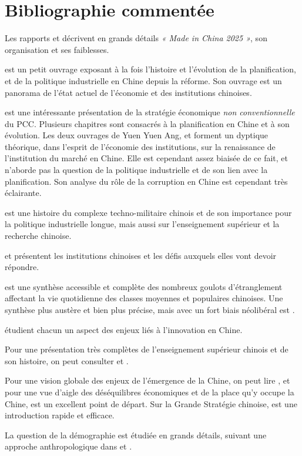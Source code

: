 \documentclass[a4paper]{article}
\begin{document}
\section{Bibliographie commentée}
\label{sec:orgc4508dc}

Les rapports \cite{Made_In_China_2025} et \cite{Evolving_MiC25} décrivent en grands détails \textit{« Made in China 2025 »}, son organisation et ses faiblesses.

\cite{naughton21_rise} est un petit ouvrage exposant à la fois l’histoire et l’évolution de la planification, et de la politique industrielle en Chine depuis la réforme. Son ouvrage \cite{naughton18_chines} est un panorama de l’état actuel de l’économie et des institutions chinoises.

\cite{heilmann18_red} est une intéressante présentation de la stratégie économique \textit{non conventionnelle} du PCC. Plusieurs chapitres sont consacrés à la planification en Chine et à son évolution. Les deux ouvrages de Yuen Yuen Ang, \cite{ang20_chinas} et \cite{ang16_how_china} forment un dyptique théorique, dans l’esprit de l’économie des institutions, sur la renaissance de l’institution du marché en Chine. Elle est cependant assez biaisée de ce fait, et n’aborde pas la question de la politique industrielle et de son lien avec la planification. Son analyse du rôle de la corruption en Chine est cependant très éclairante. 

\cite{feigenbaum03_chinas} est une histoire du complexe techno-militaire chinois et de son importance pour la politique industrielle longue, mais aussi sur l’enseignement supérieur et la recherche chinoise.

\cite{heilmann17_chinas,dickson16} et \cite{cabestan18_demain_chine} présentent les institutions chinoises et les défis auxquels elles vont devoir répondre. 

\cite{damien14_in} est une synthèse accessible et complète des nombreux goulots d’étran\-gle\-ment affectant la vie quotidienne des classes moyennes et populaires chinoises. Une synthèse plus austère et bien plus précise, mais avec un fort biais néolibéral est \cite{dollar20_china}.

\cite{xiaolan15_chinas,haour16_creat_china,hong17_networ_china} étudient chacun un aspect des enjeux liés à l’innovation en Chine.

Pour une présentation très complètes de l’enseignement supérieur chinois et de son histoire, on peut consulter \cite{andreas09_rise} et \cite{simon09_chinas}.

Pour une vision globale des enjeux de l’émergence de la Chine, on peut lire \cite{shambaugh13_china}, et pour une vue d’aigle des déséquilibres économiques et de la place qu’y occupe la Chine, \cite{klein20_trade} est un excellent point de départ. Sur la Grande Stratégie chinoise, \cite{khan18_haunt} est une introduction rapide et efficace.

La question de la démographie est étudiée en grands détails, suivant une approche anthropologique dans \cite{greenhalgh08_just,greenhalgh05_gover_chinas} et \cite{greenhalgh10_cultiv}.



\end{document}
